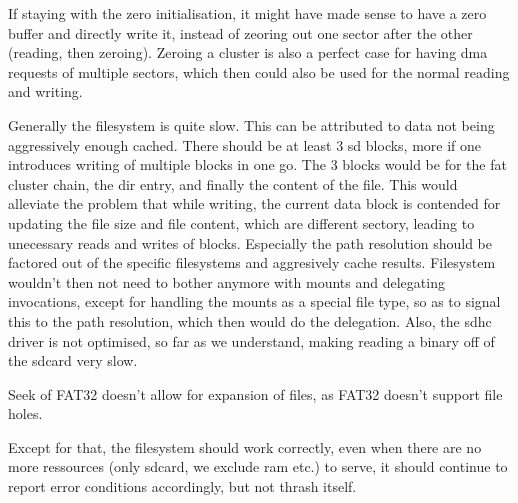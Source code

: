 If staying with the zero initialisation, it might have made sense to have a zero
buffer and directly write it, instead of zeoring out one sector after the other
(reading, then zeroing).
Zeroing a cluster is also a perfect case for having dma requests of multiple
sectors, which then could also be used for the normal reading and writing.

Generally the filesystem is quite slow.
This can be attributed to data not being aggressively enough cached.
There should be at least 3 sd blocks, more if one introduces writing of multiple
blocks in one go.
The 3 blocks would be for the fat cluster chain, the dir entry, and finally the
content of the file.
This would alleviate the problem that while writing, the current data block is
contended for updating the file size and file content, which are different
sectory, leading to unecessary reads and writes of blocks.
Especially the path resolution should be factored out of the specific
filesystems and aggresively cache results.
Filesystem wouldn't then not need to bother anymore with mounts and delegating
invocations, except for handling the mounts as a special file type, so as to
signal this to the path resolution, which then would do the delegation.
Also, the sdhc driver is not optimised, so far as we understand, making reading
a binary off of the sdcard very slow.

Seek of FAT32 doesn't allow for expansion of files, as FAT32 doesn't support
file holes.

Except for that, the filesystem should work correctly, even when there are no
more ressources (only sdcard, we exclude ram etc.) to serve, it should continue
to report error conditions accordingly, but not thrash itself.
